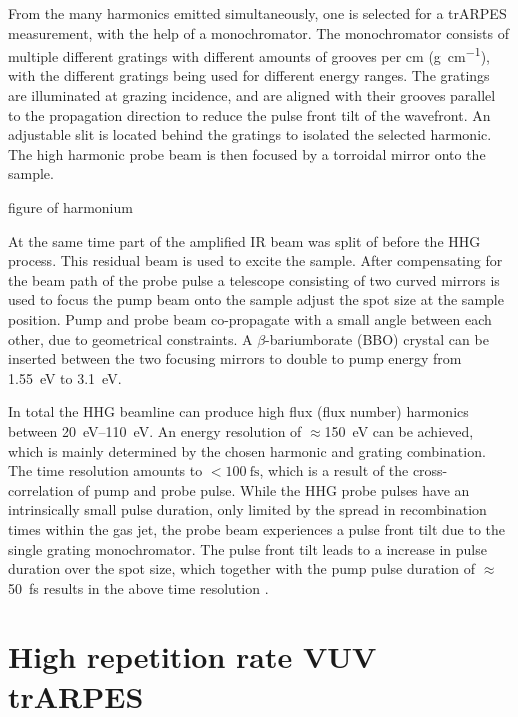 From the many harmonics emitted simultaneously, one is selected for a trARPES measurement, with the help of a monochromator.
The monochromator consists of multiple different gratings with different amounts of grooves per \unit{cm} (\unit{g\per\cm}), with the different gratings being used for different energy ranges.
The gratings are illuminated at grazing incidence, and are aligned with their grooves parallel to the propagation direction to reduce the pulse front tilt of the wavefront.
An adjustable slit is located behind the gratings to isolated the selected harmonic.
The high harmonic probe beam is then focused by a torroidal mirror onto the sample.

figure of harmonium

At the same time part of the amplified IR beam was split of before the HHG process.
This residual beam is used to excite the sample.
After compensating for the beam path of the probe pulse a telescope consisting of two curved mirrors is used to focus the pump beam onto the sample adjust the spot size at the sample position.
Pump and probe beam co-propagate with a small angle between each other, due to geometrical constraints.
A $\beta$-bariumborate (BBO) crystal can be inserted between the two focusing mirrors to double to pump energy from \qty{1.55}{\electronvolt} to \qty{3.1}{\electronvolt}.

In total the HHG beamline can produce high flux (flux number) harmonics between \qtyrange{20}{110}{\electronvolt}.
An energy resolution of $\approx$\qty{150}{\electronvolt} can be achieved, which is mainly determined by the chosen harmonic and grating combination.
The time resolution amounts to $<\qty{100}{\femto\second}$, which is a result of the cross-correlation of pump and probe pulse.
While the HHG probe pulses have an intrinsically small pulse duration, only limited by the spread in recombination times within the gas jet, the probe beam experiences a pulse front tilt due to the single grating monochromator.
The pulse front tilt leads to a increase in pulse duration over the spot size, which together with the pump pulse duration of $\approx$\qty{50}{\femto\second} results in the above time resolution \cite{arrell_harmonium_2017}.

\section{High repetition rate VUV trARPES}

